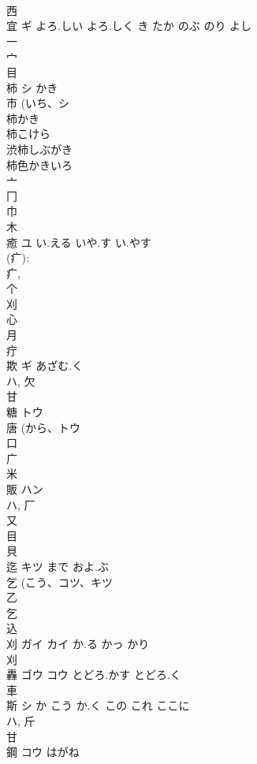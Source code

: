 \documentclass[8pt]{extreport}
\begin{document}
\begin{CJK}{UTF8}{min}
\\	西 
\\	宜	ギ	よろ.しい よろ.しく き たか のぶ のり よし	
\\	一 
\\	宀 
\\	目 
\\	柿	シ	かき	
\\	市 (いち、シ 
\\	柿かき 
\\	柿こけら 
\\	渋柿しぶがき 
\\	柿色かきいろ 
\\	亠 
\\	冂 
\\	巾 
\\	木 
\\	癒	ユ	い.える いや.す い.やす	
\\	(疒): 
\\	疒, 
\\	个 
\\	刈 
\\	心 
\\	月 
\\	疔 
\\	欺	ギ	あざむ.く	
\\	ハ, 欠 
\\	甘 
\\	糖	トウ		
\\	唐 (から、トウ 
\\	口 
\\	广 
\\	米 
\\	販	ハン		
\\	ハ, 厂 
\\	又 
\\	目 
\\	貝 
\\	迄	キツ	まで およ.ぶ	
\\	乞 (こう、コツ、キツ 
\\	乙 
\\	乞 
\\	込 
\\	刈	ガイ カイ	か.る かっ かり	
\\	刈 
\\	轟	ゴウ コウ	とどろ.かす とどろ.く	
\\	車 
\\	斯	シ	か こう か.く この これ ここに	
\\	ハ, 斤 
\\	甘 
\\	鋼	コウ	はがね	

\end{CJK}
\end{document}
